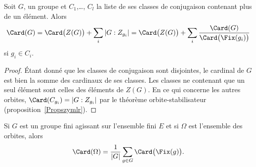 \begin{corollary}
    Soit \( G\), un groupe et \( C_1\),\ldots, \( C_l\) la liste de ses classes de conjugaison contenant plus de un élément. Alors
    \begin{equation}        \label{EqkgGmoq}
        \Card(G)=\Card\big( Z(G) \big)+\sum_i| G:Z_{g_i} |=\Card\big( Z(G) \big)+\sum_i\frac{ \Card(G) }{ \Card\big( \Fix(g_i) \big) }
    \end{equation}
    si \( g_i\in C_i\).
\end{corollary}

\begin{proof}
    Étant donné que les classes de conjugaison sont disjointes, le cardinal de \( G\) est bien la somme des cardinaux de ses classes. Les classes ne contenant que un seul élément sont celles des éléments de \( Z(G)\). En ce qui concerne les autres orbites, \( \Card(C_{g_i})=| G:Z_{g_i} |\) par le théorème orbite-stabilisateur (proposition~\ref{Propszymlr}).
\end{proof}

\begin{theorem}      \label{THOooEFDMooDfosOw}
    Si \( G\) est un groupe fini agissant sur l'ensemble fini \( E\) et si \( \Omega\) est l'ensemble des orbites, alors
    \begin{equation}    \label{EqTUsblv}
        \Card(\Omega)=\frac{1}{ | G | }\sum_{g\in G}\Card\big( \Fix(g) \big).
    \end{equation}
\end{theorem}


